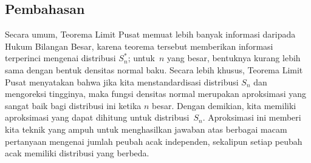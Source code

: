 \subsection*{Pembahasan}
Secara umum, Teorema Limit Pusat memuat lebih banyak informasi daripada Hukum Bilangan Besar,
karena teorema tersebut memberikan informasi terperinci mengenai  distribusi $S_n^*$;
untuk~$n$ yang besar, bentuknya kurang lebih sama dengan bentuk densitas normal baku.  Secara lebih
khusus, Teorema Limit Pusat menyatakan bahwa jika kita menstandardisasi distribusi $S_n$ dan
mengoreksi tingginya, maka fungsi densitas normal merupakan aproksimasi yang sangat baik bagi
distribusi ini ketika $n$ besar.  Dengan demikian, kita memiliki aproksimasi yang dapat dihitung
untuk distribusi~$S_n$.  Aproksimasi ini memberi kita teknik yang ampuh untuk menghasilkan jawaban
atas berbagai macam pertanyaan mengenai jumlah peubah acak independen, sekalipun setiap peubah acak
memiliki distribusi yang berbeda.

